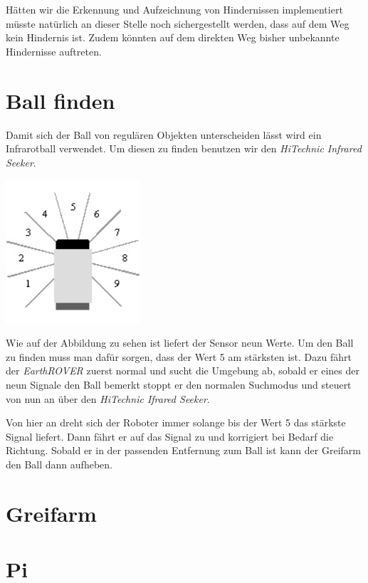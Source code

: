 Hätten wir die Erkennung und Aufzeichnung von Hindernissen implementiert müsste natürlich an dieser Stelle noch sichergestellt werden, dass auf dem Weg kein Hindernis ist. Zudem könnten auf dem direkten Weg bisher unbekannte Hindernisse auftreten.

\section{Ball finden}
Damit sich der Ball von regulären Objekten unterscheiden lässt wird ein Infrarotball verwendet. Um diesen zu finden benutzen wir den \textit{HiTechnic Infrared Seeker}.

\begin{capfigure}
	\includegraphics[width=5cm]{images/implementation/irseeker}
\end{capfigure}

Wie auf der Abbildung zu sehen ist liefert der Sensor neun Werte. Um den Ball zu finden muss man dafür sorgen, dass der Wert 5 am stärksten ist. Dazu fährt der \textit{EarthROVER} zuerst normal und sucht die Umgebung ab, sobald er eines der neun Signale den Ball bemerkt stoppt er den normalen Suchmodus und steuert von nun an über den \textit{HiTechnic Ifrared Seeker}.

Von hier an dreht sich der Roboter immer solange bis der Wert 5 das stärkste Signal liefert. Dann fährt er auf das Signal zu und korrigiert bei Bedarf die Richtung. Sobald er in der passenden Entfernung zum Ball ist kann der Greifarm den Ball dann aufheben.

\section{Greifarm}

\section{Pi}